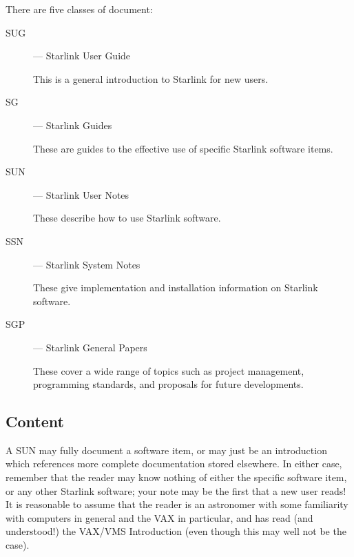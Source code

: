 There are five classes of document:
\begin{description}
\begin{description}
\item [SUG] --- Starlink User Guide

This is a general introduction to Starlink for new users.

\item [SG] --- Starlink Guides

These are guides to the effective use of specific Starlink software items.

\item [SUN] --- Starlink User Notes

These describe how to use Starlink software.

\item [SSN] --- Starlink System Notes

These give implementation and installation information on Starlink software.

\item [SGP] --- Starlink General Papers

These cover a wide range of topics such as project management, programming
standards, and proposals for future developments.
\end{description}
\end{description}

\subsection{Content}

A SUN may fully document a software item, or may just be an introduction
which references more complete documentation stored elsewhere.
In either case, remember that the reader may know nothing of either the specific
software item, or any other Starlink software; your note may be the first that a
new user reads!
It is reasonable to assume that the reader is an astronomer with some
familiarity with computers in general and the VAX in particular, and has read
(and understood!) the VAX/VMS Introduction (even though this may well not be
the case).

